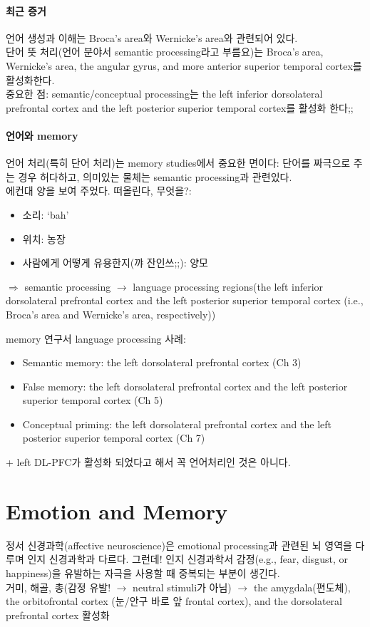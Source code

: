 \documentclass[../note.tex]{subfiles}
\begin{document}
\paragraph{최근 증거}
언어 생성과 이해는 Broca's area와 Wernicke's area와 관련되어 있다.\\
단어 뜻 처리(언어 분야서 semantic processing라고 부름요)는 Broca’s area, Wernicke’s area, the angular gyrus, and more anterior
superior temporal cortex를 활성화한다.\\
중요한 점: semantic/conceptual processing는 the left inferior dorsolateral prefrontal
cortex and the left posterior superior temporal cortex를 활성화 한다;;

\paragraph{언어와 memory}
언어 처리(특히 단어 처리)는 memory studies에서 중요한 면이다:
단어를 짜극으로 주는 경우 허다하고, 의미있는 물체는 semantic processing과 관련있다.\\
에컨대 양을 보여 주었다. 떠올린다, 무엇을?:
\begin{itemize}
  \item 소리: `bah'
  \item 위치: 농장
  \item 사람에게 어떻게 유용한지(꺄 잔인쓰;;): 양모
\end{itemize}
$\Longrightarrow$ semantic processing $\rightarrow$ language processing regions(the left inferior dorsolateral prefrontal cortex and
the left posterior superior temporal cortex (i.e., Broca’s area and
Wernicke’s area, respectively))

memory 연구서 language processing 사례:
\begin{itemize}
  \item Semantic memory: the left dorsolateral prefrontal cortex (Ch 3)
  \item False memory: the left dorsolateral prefrontal cortex and the left posterior superior
temporal cortex (Ch 5)
  \item Conceptual priming: the left dorsolateral prefrontal cortex and the
left posterior superior temporal cortex (Ch 7)
\end{itemize}

+ left DL-PFC가 활성화 되었다고 해서 꼭 언어처리인 것은 아니다.


\section{Emotion and Memory}
\label{sec:emotion}
정서 신경과학(affective neuroscience)은 emotional processing과 관련된 뇌 영역을 다루며 인지 신경과학과 다르다.
그런데! 인지 신경과학서 감정(e.g., fear, disgust, or happiness)을 유발하는 자극을 사용할 때 중복되는 부분이 생긴다.\\
거미, 해골, 총(감정 유발! $\rightarrow$ neutral stimuli가 아님) $\longrightarrow$ the amygdala(편도체), the orbitofrontal cortex (눈/안구 바로 앞 frontal cortex), and the dorsolateral prefrontal cortex 활성화
\end{document}
